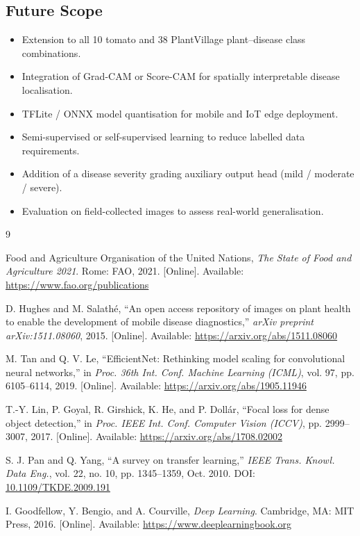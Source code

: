 \documentclass[12pt, a4paper, onecolumn]{IEEEtran}
\begin{document}
\subsection{Future Scope}

\begin{itemize}[leftmargin=1.6em, noitemsep]
  \item Extension to all 10 tomato and 38 PlantVillage plant--disease class combinations.
  \item Integration of Grad-CAM or Score-CAM for spatially interpretable disease localisation.
  \item TFLite / ONNX model quantisation for mobile and IoT edge deployment.
  \item Semi-supervised or self-supervised learning to reduce labelled data requirements.
  \item Addition of a disease severity grading auxiliary output head (mild / moderate / severe).
  \item Evaluation on field-collected images to assess real-world generalisation.
\end{itemize}

\begin{thebibliography}{9}

  Food and Agriculture Organisation of the United Nations,
  \textit{The State of Food and Agriculture 2021}.
  Rome: FAO, 2021.
  [Online]. Available: \url{https://www.fao.org/publications}

  D. Hughes and M. Salath\'{e},
  ``An open access repository of images on plant health to enable the development
  of mobile disease diagnostics,''
  \textit{arXiv preprint arXiv:1511.08060}, 2015.
  [Online]. Available: \url{https://arxiv.org/abs/1511.08060}

  M. Tan and Q. V. Le,
  ``EfficientNet: Rethinking model scaling for convolutional neural networks,''
  in \textit{Proc. 36th Int. Conf. Machine Learning (ICML)},
  vol. 97, pp. 6105--6114, 2019.
  [Online]. Available: \url{https://arxiv.org/abs/1905.11946}

  T.-Y. Lin, P. Goyal, R. Girshick, K. He, and P. Doll\'{a}r,
  ``Focal loss for dense object detection,''
  in \textit{Proc. IEEE Int. Conf. Computer Vision (ICCV)},
  pp. 2999--3007, 2017.
  [Online]. Available: \url{https://arxiv.org/abs/1708.02002}

  S. J. Pan and Q. Yang,
  ``A survey on transfer learning,''
  \textit{IEEE Trans. Knowl. Data Eng.},
  vol. 22, no. 10, pp. 1345--1359, Oct. 2010.
  DOI: \href{https://doi.org/10.1109/TKDE.2009.191}{10.1109/TKDE.2009.191}

  I. Goodfellow, Y. Bengio, and A. Courville,
  \textit{Deep Learning}. Cambridge, MA: MIT Press, 2016.
  [Online]. Available: \url{https://www.deeplearningbook.org}

\end{thebibliography}
\end{document}
